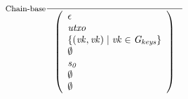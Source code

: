 \documentclass[11pt,a4paper]{article}
\newcommand{\var}[1]{\mathit{#1}}
\newcommand{\Gkeys}{\var{G_{keys}}}
\begin{document}
\begin{figure}
  \begin{equation}
    \label{eq:rule:chain-base}
    \inference[Chain-base]
    {}
    {\left(
        \begin{array}{l}
          \epsilon\\
          \var{utxo}\\
          \var{\{ (\var{vk}, \var{vk}) \mid \var{vk} \in \Gkeys\}}\\
          \emptyset\\
          \var{s_0}\\
          \emptyset\\
          \emptyset
        \end{array}
      \right)
    }
  \end{equation}


\end{figure}
\end{document}
